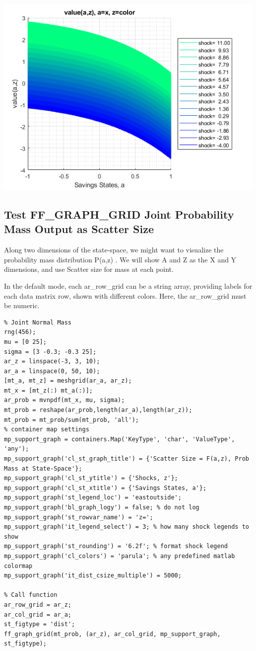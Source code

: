 \documentclass[
]{book}
\begin{document}
\includegraphics[width=5.20833in,height=\textheight]{img/fx_graph_grid_images/figure_7.png}

\hypertarget{test-ff_graph_grid-joint-probability-mass-output-as-scatter-size}{%
\subsection{Test FF\_GRAPH\_GRID Joint Probability Mass Output as Scatter Size}\label{test-ff_graph_grid-joint-probability-mass-output-as-scatter-size}}

Along two dimensions of the state-space, we might want to visualize the
probability mass distribution P(a,z) . We will show A and Z as the X and
Y dimensions, and use Scatter size for mass at each point.

In the default mode, each ar\_row\_grid can be a string array, providing
labels for each data matrix row, shown with different colors. Here, the
ar\_row\_grid must be numeric.

\begin{verbatim}
% Joint Normal Mass
rng(456);
mu = [0 25];
sigma = [3 -0.3; -0.3 25];
ar_z = linspace(-3, 3, 10);
ar_a = linspace(0, 50, 10);
[mt_a, mt_z] = meshgrid(ar_a, ar_z);
mt_x = [mt_z(:) mt_a(:)];
ar_prob = mvnpdf(mt_x, mu, sigma);
mt_prob = reshape(ar_prob,length(ar_a),length(ar_z));
mt_prob = mt_prob/sum(mt_prob, 'all');
% container map settings
mp_support_graph = containers.Map('KeyType', 'char', 'ValueType', 'any');
mp_support_graph('cl_st_graph_title') = {'Scatter Size = F(a,z), Prob Mass at State-Space'};
mp_support_graph('cl_st_ytitle') = {'Shocks, z'};
mp_support_graph('cl_st_xtitle') = {'Savings States, a'};
mp_support_graph('st_legend_loc') = 'eastoutside';
mp_support_graph('bl_graph_logy') = false; % do not log
mp_support_graph('st_rowvar_name') = 'z=';
mp_support_graph('it_legend_select') = 3; % how many shock legends to show
mp_support_graph('st_rounding') = '6.2f'; % format shock legend
mp_support_graph('cl_colors') = 'parula'; % any predefined matlab colormap
mp_support_graph('it_dist_csize_multiple') = 5000;

% Call function
ar_row_grid = ar_z;
ar_col_grid = ar_a;
st_figtype = 'dist';
ff_graph_grid(mt_prob, (ar_z), ar_col_grid, mp_support_graph, st_figtype);
\end{verbatim}
\end{document}
